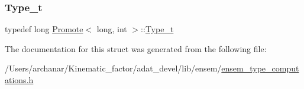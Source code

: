 \subsubsection{\texorpdfstring{Type\_t}{Type\_t}\hspace{0.1cm}{\footnotesize\ttfamily [2/2]}}
{\footnotesize\ttfamily typedef long \mbox{\hyperlink{structPromote}{Promote}}$<$ long, int $>$\+::\mbox{\hyperlink{structPromote_3_01long_00_01int_01_4_ab0ceeb6c9abec4d97d5caab44831ba92}{Type\+\_\+t}}}



The documentation for this struct was generated from the following file\+:\begin{DoxyCompactItemize}
\item 
/\+Users/archanar/\+Kinematic\+\_\+factor/adat\+\_\+devel/lib/ensem/\mbox{\hyperlink{lib_2ensem_2ensem__type__computations_8h}{ensem\+\_\+type\+\_\+computations.\+h}}\end{DoxyCompactItemize}
